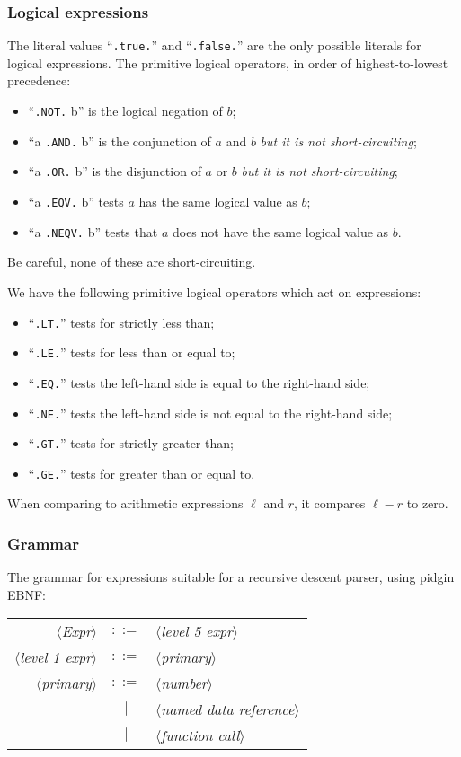 \subsubsection{Logical expressions}
The literal values ``\texttt{.true.}'' and ``\texttt{.false.}'' are the
only possible literals for logical expressions. The primitive logical
operators, in order of highest-to-lowest precedence:
\begin{itemize}
\item ``\texttt{.NOT.} b'' is the logical negation of $b$;
\item ``a \texttt{.AND.} b'' is the conjunction of $a$ and $b$ \emph{but it is not short-circuiting};
\item ``a \texttt{.OR.} b'' is the disjunction of $a$ or $b$ \emph{but it is not short-circuiting};
\item ``a \texttt{.EQV.} b'' tests $a$ has the same logical value as $b$;
\item ``a \texttt{.NEQV.} b'' tests that $a$ does not have the same
  logical value as $b$.
\end{itemize}
Be careful, none of these are short-circuiting.

We have the following primitive logical operators which act on expressions:
\begin{itemize}
\item ``\texttt{.LT.}'' tests for strictly less than;
\item ``\texttt{.LE.}'' tests for less than or equal to;
\item ``\texttt{.EQ.}'' tests the left-hand side is equal to the
  right-hand side;
\item ``\texttt{.NE.}'' tests the left-hand side is not equal to the
  right-hand side;
\item ``\texttt{.GT.}'' tests for strictly greater than;
\item ``\texttt{.GE.}'' tests for greater than or equal to.
\end{itemize}
When comparing to arithmetic expressions $\ell$ and $r$, it compares
$\ell-r$ to zero.

\subsubsection{Grammar}
The grammar for expressions suitable for a recursive descent parser,
using pidgin EBNF:

\begin{tabular}{rcl}
$\langle$\textit{Expr}$\rangle$ & $::=$ & $\langle$\textit{level 5 expr}$\rangle$\\
$\langle$\textit{level 1 expr}$\rangle$ & $::=$ & $\langle$\textit{primary}$\rangle$\\
$\langle$\textit{primary}$\rangle$ & $::=$ & $\langle$\textit{number}$\rangle$\\
  & $\mid$ & $\langle$\textit{named data reference}$\rangle$\\
  & $\mid$ & $\langle$\textit{function call}$\rangle$\\
\end{tabular}

